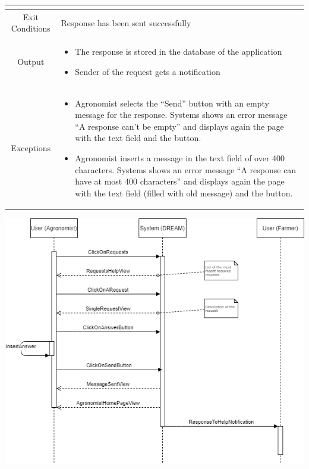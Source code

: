 \documentclass{article}
\begin{document}
\begin{center}
\begin{longtable}{|c| p{10cm}|}
\begin{itemize}
                            \end{itemize} \\
        \hline
            Exit Conditions & Response has been sent successfully \\
        \hline
            Output &    \begin{itemize}
                            \item The response is stored in the database of the application
                            \item Sender of the request gets a notification
                        \end{itemize}\\
        \hline
            Exceptions & \begin{itemize}
                            \item Agronomist selects the “Send” button with an empty message for the response. Systems shows an error message “A response can’t be empty” and displays again the page with the text field and the button.
                            \item Agronomist inserts a message in the text field of over 400 characters. Systems shows an error message “A response can have at most 400 characters” and displays again the page with the text field (filled with old message) and the button.
                        \end{itemize}\\
        \hline
    \end{longtable}
    
    \newpage
    
    \includegraphics[width=1.0\textwidth]{images/sequenceDiagrams/14. AgronomistRespondHelp.png}
    \par
    \caption{\label{fig:frog}Agronomist answers to “Request for Help and Suggestions” of farmers}


\end{center}
\end{document}
